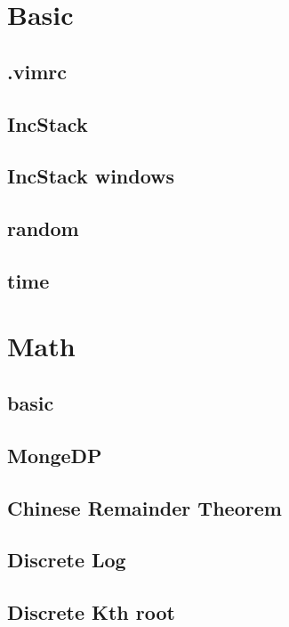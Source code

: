 \section{Basic}
\subsection{.vimrc}

\subsection{IncStack}

\subsection{IncStack windows}

\subsection{random}

\subsection{time}


\section{Math}
\subsection{basic}

\subsection{MongeDP}

\subsection{Chinese Remainder Theorem}

\subsection{Discrete Log}

\subsection{Discrete Kth root}

